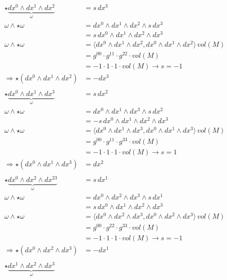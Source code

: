 \begin{align*}
	\star \underbrace{dx^0 \wedge dx^1 \wedge dx^2}_{\omega}
	&=
	s \, dx^3
	\\
	\omega \wedge \star \omega 
	&=
	dx^0 \wedge dx^1 \wedge dx^2 \wedge s \, dx^3
	\\
	&=
	s \, dx^0 \wedge dx^1 \wedge dx^2 \wedge dx^3
	\\
	\omega \wedge \star \omega
	&=
	\langle dx^0 \wedge dx^1 \wedge dx^2 , dx^0 \wedge dx^1 \wedge dx^2 \rangle \, vol(M)
	\\
	&=
	g^{00} \cdot g^{11} \cdot g^{22} \cdot vol(M)
	\\
	&=
	-1 \cdot 1 \cdot 1 \cdot vol(M) \rightarrow s = -1
	\\
	\Rightarrow \star (dx^0 \wedge dx^1 \wedge dx^2) 
	&= - dx^3
\\
\\
	\star \underbrace{dx^0 \wedge dx^1 \wedge dx^3}_{\omega}
	&=
	s \, dx^2
	\\
	\omega \wedge \star \omega 
	&=
	dx^0 \wedge dx^1 \wedge dx^3 \wedge s \, dx^2
	\\
	&=
	-s \, dx^0 \wedge dx^1 \wedge dx^2 \wedge dx^3
	\\
	\omega \wedge \star \omega
	&=
	\langle dx^0 \wedge dx^1 \wedge dx^3 , dx^0 \wedge dx^1 \wedge dx^3 \rangle \, vol(M)
	\\
	&=
	g^{00} \cdot g^{11} \cdot g^{33} \cdot vol(M)
	\\
	&=
	-1 \cdot 1 \cdot 1 \cdot vol(M) \rightarrow s = 1
	\\
	\Rightarrow \star (dx^0 \wedge dx^1 \wedge dx^3) 
	&= dx^2
\\
\\
	\star \underbrace{dx^0 \wedge dx^2 \wedge dx^23}_{\omega}
	&=
	s \, dx^1
	\\
	\omega \wedge \star \omega 
	&=
	dx^0 \wedge dx^2 \wedge dx^3 \wedge s \, dx^1
	\\
	&=
	s \, dx^0 \wedge dx^1 \wedge dx^2 \wedge dx^3
	\\
	\omega \wedge \star \omega
	&=
	\langle dx^0 \wedge dx^2 \wedge dx^3 , dx^0 \wedge dx^2 \wedge dx^3 \rangle \, vol(M)
	\\
	&=
	g^{00} \cdot g^{22} \cdot g^{33} \cdot vol(M)
	\\
	&=
	-1 \cdot 1 \cdot 1 \cdot vol(M) \rightarrow s = -1
	\\
	\Rightarrow \star (dx^0 \wedge dx^2 \wedge dx^3) 
	&= - dx^1
\\
\\
	\star \underbrace{dx^1 \wedge dx^2 \wedge dx^3}_{\omega}

\end{align*}

